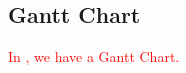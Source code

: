 \documentclass[main.tex]{subfiles}
\begin{document}
\begin{appendices}
\chapter{Gantt Chart}
\textcolor{red}{In , we have a Gantt Chart.}
\end{appendices}
\end{document}
